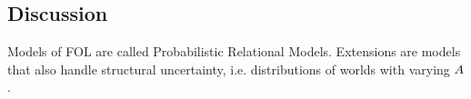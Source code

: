 


\subsection{Discussion}

Models of FOL are called Probabilistic Relational Models. %
Extensions are models that also handle structural uncertainty, i.e. distributions of worlds with varying $A$.



